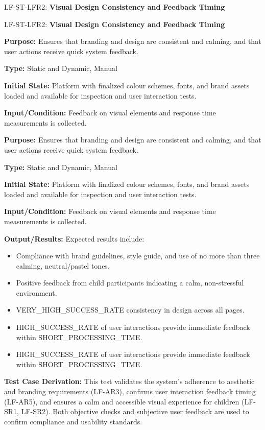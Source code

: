 \documentclass[12pt, titlepage]{article}
\begin{document}
  \item LF-ST-LFR2: \textbf{Visual Design Consistency and Feedback Timing}
  \item LF-ST-LFR2: \textbf{Visual Design Consistency and Feedback Timing}
  \begin{mdframed}[linewidth=0.5mm] 
    \textbf{Purpose:} Ensures that branding and design are consistent and calming, and that user actions receive quick system feedback. \par
    \textbf{Type:} Static and Dynamic, Manual \par 
    \textbf{Initial State:} Platform with finalized colour schemes, fonts, and brand assets loaded and available for inspection and user interaction tests. \par 
    \textbf{Input/Condition:} Feedback on visual elements and response time measurements is collected. \par 
    \textbf{Purpose:} Ensures that branding and design are consistent and calming, and that user actions receive quick system feedback. \par
    \textbf{Type:} Static and Dynamic, Manual \par 
    \textbf{Initial State:} Platform with finalized colour schemes, fonts, and brand assets loaded and available for inspection and user interaction tests. \par 
    \textbf{Input/Condition:} Feedback on visual elements and response time measurements is collected. \par 
    \textbf{Output/Results:} Expected results include: 
    \begin{itemize} 
      \item Compliance with brand guidelines, style guide, and use of no more than three calming, neutral/pastel tones. 
      \item Positive feedback from child participants indicating a calm, non-stressful environment. 
      \item VERY\_HIGH\_SUCCESS\_RATE consistency in design across all pages. 
      \item HIGH\_SUCCESS\_RATE of user interactions provide immediate feedback \\ within SHORT\_PROCESSING\_TIME. 
      \item HIGH\_SUCCESS\_RATE of user interactions provide immediate feedback \\ within SHORT\_PROCESSING\_TIME. 
    \end{itemize} \par 
    \textbf{Test Case Derivation:} This test validates the system’s adherence to aesthetic and branding requirements (LF-AR3), confirms user interaction feedback timing (LF-AR5), and ensures a calm and accessible visual experience for children (LF-SR1, LF-SR2). Both objective checks and subjective user feedback are used to confirm compliance and usability standards. \par

\end{mdframed}
\end{document}
